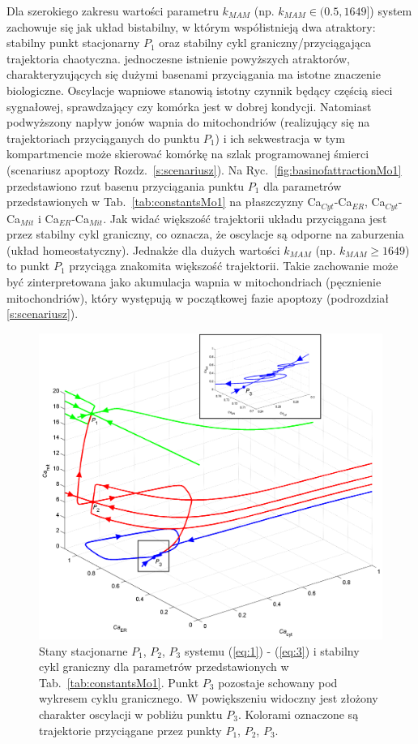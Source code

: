 Dla szerokiego zakresu wartości parametru $k_{MAM}$ (np. $k_{MAM} \in (0.5, 1649]$) system zachowuje się jak układ bistabilny, w którym współistnieją dwa atraktory: stabilny punkt stacjonarny $P_1$ oraz stabilny cykl graniczny/przyciągająca trajektoria chaotyczna. jednoczesne istnienie powyższych atraktorów, charakteryzujących się dużymi basenami przyciągania ma istotne znaczenie biologiczne. Oscylacje wapniowe stanowią istotny czynnik będący częścią sieci sygnałowej, sprawdzający czy komórka jest w dobrej kondycji. Natomiast podwyższony napływ jonów wapnia do mitochondriów (realizujący się na trajektoriach przyciąganych do punktu $P_1$) i ich sekwestracja w tym kompartmencie może skierować komórkę na szlak programowanej śmierci (scenariusz apoptozy Rozdz.~\ref{s:scenariusz}). Na Ryc.~\ref{fig:basinofattractionMo1} przedstawiono rzut basenu przyciągania punktu $P_1$ dla parametrów przedstawionych w Tab.~\ref{tab:constantsMo1} na płaszczyzny Ca$_{Cyt}$-Ca$_{ER}$, Ca$_{Cyt}$-Ca$_{Mit}$ i Ca$_{ER}$-Ca$_{Mit}$. Jak widać większość trajektorii układu przyciągana jest przez stabilny cykl graniczny, co oznacza, że oscylacje są odporne na zaburzenia (układ homeostatyczny). Jednakże dla dużych wartości $k_{MAM}$ (np. $k_{MAM} \geq 1649$) to punkt $P_1$ przyciąga znakomita większość trajektorii. Takie zachowanie może być zinterpretowana jako akumulacja wapnia w mitochondriach (pęcznienie mitochondriów), który występują w początkowej fazie apoptozy (podrozdział \ref{s:scenariusz}).


\begin{figure}[ht!]
	\centering
	\includegraphics[width=1\textwidth]{rysunki/rozdzial_5/steadystatesMo1}
	\caption[Punkty stacjonarne systemu w Modelu \#1]{Stany stacjonarne $P_1$, $P_2$, $P_3$ systemu (\ref{eq:1}) - (\ref{eq:3}) i stabilny cykl graniczny dla parametrów przedstawionych w Tab.~\ref{tab:constantsMo1}. Punkt $P_3$ pozostaje schowany pod wykresem cyklu granicznego. W powiększeniu widoczny jest złożony charakter oscylacji w pobliżu punktu $P_3$. Kolorami oznaczone są trajektorie przyciągane przez punkty $P_1$, $P_2$, $P_3$.}
	\label{fig:steadystatesMo1}
\end{figure}

